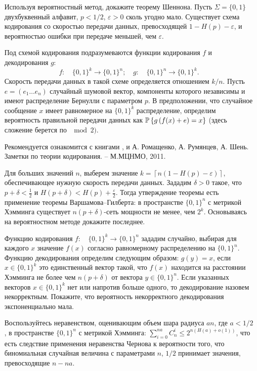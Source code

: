 \begin{problem}

Используя вероятностный метод, докажите теорему 
Шеннона. Пусть $\Sigma =\{0,1\}$ {\-} двухбуквенный алфавит, 
$p<1/2$, $\varepsilon >0$ сколь угодно мало. Существует схема 
кодирования со скоростью передачи данных, превосходящей $1-H(p)-\varepsilon 
$, и вероятностью ошибки при передаче меньшей, чем $\varepsilon $.

Под схемой кодирования подразумеваются функции кодирования $f$ и 
декодирования $g$: 
\[f:\quad \{0,1\}^k\to \{0,1\}^n; \quad g:\quad \{0,1\}^n\to 
\{0,1\}^k.\] Скорость передачи данных в такой схеме определяется отношением 
$k/n$. Пусть $e=\left( {e_1 \ldots e_n } \right)$ {\-} случайный шумовой
вектор, компоненты которого независимы и имеют распределение Бернулли с 
параметром $p$. В предположении, что случайное сообщение $x$ имеет 
равномерное на $\{0,1\}^k$ распределение, определим вероятность правильной передачи данных как $\mathrm{{\mathbb P}}\left\{ {g\left( {f(x)+e} \right)=x} \right\}$ (здесь сложение берется по $\mod {2})$.
\end{problem}

\begin{ordre}
Рекомендуется ознакомится с книгами \cite{15}, \cite{444} и А. Ромащенко, А. Румянцев, А. Шень. Заметки по теории кодирования. -- М.МЦНМО, 2011.

Для больших значений $n$, выберем значение $k=\left\lceil {n\left( {1-H(p)-\varepsilon } \right)} \right\rceil $, обеспечивающее 
нужную скорость передачи данных. Зададим $\delta >0$ такое, что $p+\delta <\frac{1}{2}$ и $H(p+\delta )<H(p)+\frac{\varepsilon }{2}$. Тогда утверждение теоремы есть применение теоремы Варшамова--Гилберта: в пространстве $\{0,1\}^n$ с метрикой Хэмминга существует $n(p+\delta )$-сеть мощности не менее, чем $2^k$. Основываясь на вероятностном методе докажите 
последнее. 

Функцию кодирования $f:\quad \{0,1\}^k\to 
\{0,1\}^n$ зададим случайно, выбирая для каждого $x$ значение $f(x)$ 
согласно равномерному распределению на $\{0,1\}^n$. Функцию декодирования определим следующим образом: $g(y)=x$, если $x\in \{0,1\}^k$ {\-} это единственный вектор такой, что $f(x)$ находится на расстоянии Хэмминга не более чем $n(p+\delta )$ от вектора $y\in \{0,1\}^n$. Если указанных векторов $x\in \{0,1\}^k$ нет или напротив больше одного, то декодирование назовем некорректным. Покажите, что вероятность некорректного декодирования 
экспоненциально мала.

Воспользуйтесь неравенством, оценивающим объем шара радиуса $an$, где 
$a<1/2$, в пространстве $\{0,1\}^n$ с метрикой Хэмминга: 
$\sum\limits_{i=0}^{na} {C_n^i } \le 2^{n(H(a)+o(1))}$, что есть следствие 
применения неравенства Чернова к вероятности того, что биномиальная 
случайная величина с параметрами $n$, $1/2$ принимает значения, превосходящие $n-na$.
\end{ordre}


